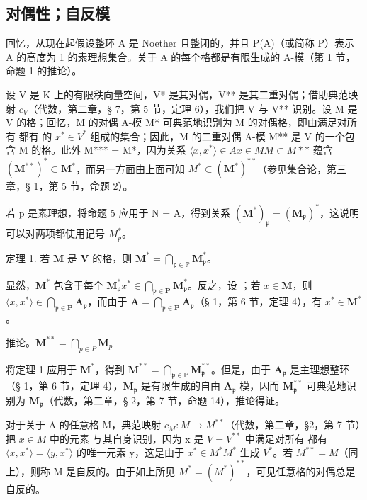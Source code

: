 \subsection{对偶性；自反模}

回忆，从现在起假设整环 A 是 Noether 且整闭的，并且 P(A)（或简称 P）表示 A 的高度为 1 的素理想集合。关于 A 的每个格都是有限生成的 A-模（第 1 节，命题 1 的推论）。

设 V 是 K 上的有限秩向量空间，V* 是其对偶，V** 是其二重对偶；借助典范映射 \(c_{V}\)（代数，第二章，§ 7，第 5 节，定理 6），我们把 V 与 V** 识别。设 M 是 V 的格；回忆，M 的对偶 A-模 M* 可典范地识别为 M 的对偶格，即由满足对所有  都有  的 \(x^{*} \in V^{*}\) 组成的集合；因此，M 的二重对偶 A-模 M** 是 V 的一个包含 M 的格。此外 M*** = M*，因为关系 \(\langle x, x^{*} \rangle \in A\)\(x \in M\)\(M \subset M**\) 蕴含 \((\mathbf{M}^{**})^{*} \subset \mathbf{M}^{*}\)，而另一方面由上面可知 \(M^{*} \subset (\mathbf{M}^{*})^{**}\)（参见集合论，第三章，§ 1，第 5 节，命题 2）。

若 p 是素理想，将命题 5 应用于 N = A，得到关系 \((\mathbf{M}^{*})_{\mathfrak{p}} = (\mathbf{M}_{\mathfrak{p}})^{*}\)，这说明可以对两项都使用记号 \(M_{p}^{*}\)。

定理 1. 若 \(\mathbf{M}\) 是 \(\mathbf{V}\) 的格，则 \(\mathbf{M}^{*} = \bigcap_{\mathfrak{p} \in \mathbb{P}} \mathbf{M}_{\mathfrak{p}}^{*}\)。

显然，\(\mathbf{M}^*\) 包含于每个 \(\mathbf{M}_{\mathfrak{p}}^{*}\)\(x^{*} \in \bigcap_{\mathfrak{p} \in \mathbf{P}} \mathbf{M}_{\mathfrak{p}}^{*}\)。反之，设 ；若 \(x \in \mathbf{M}\)，则 \(\langle x, x^{*} \rangle \in \bigcap_{\mathfrak{p} \in \mathbf{P}} \mathbf{A}_{\mathfrak{p}}\)，而由于 \(\mathbf{A} = \bigcap_{\mathfrak{p} \in \mathbf{P}} \mathbf{A}_{\mathfrak{p}}\)（§ 1，第 6 节，定理 4），有 \(x^{*} \in \mathbf{M}^{*}\)。

推论。\(\mathbf{M}^{**} = \bigcap_{p \in P}\mathbf{M}_{p}\)

将定理 1 应用于 \(\mathbf{M}^*\)，得到 \(\mathbf{M}^{**} = \bigcap_{\mathfrak{p}\in \mathbb{P}}\mathbf{M}_{\mathfrak{p}}^{**}\)。但是，由于 \(\mathbf{A}_{\mathfrak{p}}\) 是主理想整环（§ 1，第 6 节，定理 4），\(\mathbf{M}_{\mathfrak{p}}\) 是有限生成的自由 \(\mathbf{A}_{\mathfrak{p}}\)-模，因而 \(\mathbf{M}_{\mathfrak{p}}^{**}\) 可典范地识别为 \(\mathbf{M}_{\mathfrak{p}}\)（代数，第二章，§ 2，第 7 节，命题 14），推论得证。

对于关于 A 的任意格 M，典范映射 \(c_{M}: M \to M^{**}\)（代数，第二章，§2，第 7 节）把 \(x \in M\) 中的元素  与其自身识别，因为 x 是 \(V = V^{**}\) 中满足对所有  都有 \(\langle x, x^{*} \rangle = \langle y, x^{*} \rangle\) 的唯一元素 y，这是由于 \(x^{*} \in M^{*}\)\(M^{*}\) 生成 \(V^{*}\)。若 \(M^{**} = M\)（同上），则称 M 是自反的。由于如上所见 \(M^{*} = (M^{*})^{**}\)，可见任意格的对偶总是自反的。


